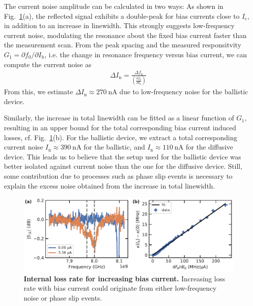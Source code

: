 The current noise amplitude can be calculated in two ways:
%
As shown in Fig.~\ref{CPRfig:SMFig-lossrates-current}(a), the reflected signal exhibits a double-peak for bias currents close to $I_\text{c}$, in addition to an increase in linewidth.
%
This strongly suggests low-frequency current noise, modulating the resonance about the fixed bias current faster than the measurement scan.
%
From the peak spacing and the measured responsitvity $G_1=\partial f_0/\partial I_\text{b}$, i.e. the change in resonance frequency versus bias current, we can compute the current noise as
\begin{align}
\Delta I_\text{n} = \frac{\Delta f_0}{\left( \frac{\partial f_0}{\partial I_\text{b}} \right)}
\label{CPReq:currnoise-a}
\end{align}
%
From this, we estimate $\Delta I_\text{n}\approx\SI{270}{\nano\ampere}$ due to low-frequency noise for the ballistic device.


Similarly, the increase in total linewidth can be fitted as a linear function of $G_1$, resulting in an upper bound for the total corresponding bias current induced losses, cf. Fig.~\ref{CPRfig:SMFig-lossrates-current}(b).
%
For the ballistic device, we extract a total corresponding current noise $I_\text{n}\approx\SI{390}{\nano\ampere}$ for the ballistic, and $I_\text{n}\approx\SI{110}{\nano\ampere}$ for the diffusive device.
%
This leads us to believe that the setup used for the ballistic device was better isolated against current noise than the one for the diffusive device.
%
Still, some contribution due to processes such as phase slip events is necessary to explain the excess noise obtained from the increase in total linewidth.

\begin{figure}
	\centering
	\includegraphics[width=\linewidth]{chapter-gJJ-CPR/figs/SMFigure-lossrates-current}
	\caption{
		\textbf{Internal loss rate for increasing bias current.}
		Increasing loss rate with bias current could originate from either low-frequency noise or phase slip events.
	}
	\label{CPRfig:SMFig-lossrates-current}
\end{figure}

